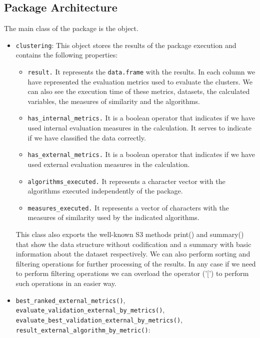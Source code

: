\subsection{Package Architecture}

The main class of the package is the  object.
\begin{itemize}
    \item \texttt{clustering}: This object stores the results of the  package execution and contains the following properties:
    \begin{itemize}
        \item \texttt{result.} It represents the \texttt{data.frame} with the results. In each column we have represented the evaluation metrics used to evaluate the clusters. We can also see the execution time of these metrics, datasets, the calculated variables, the measures of similarity and the algorithms.
        \item \texttt{has\_internal\_metrics.} It is a boolean operator that indicates if we have used internal evaluation measures in the calculation. It serves to indicate if we have classified the data correctly.
        \item \texttt{has\_external\_metrics.} It is a boolean operator that indicates if we have used external evaluation measures in the calculation.
        \item \texttt{algorithms\_executed.} It represents a character vector with the algorithms executed independently of the package.
        \item \texttt{measures\_executed.} It represents a vector of characters with the measures of similarity used by the indicated algorithms.
    \end{itemize}
    This class also exports the well-known S3 methods print() and summary() that show the data
structure without codification and a summary with basic information about the dataset respectively. We can also perform sorting and filtering operations for further processing of the results. In any case if we need to perform filtering operations we can overload the operator ('[') to perform such operations in an easier way.
    \item \texttt{best\_ranked\_external\_metrics()}, \texttt{evaluate\_validation\_external\_by\_metrics()},\\ \texttt{evaluate\_best\_validation\_external\_by\_metrics()},\\ \texttt{result\_external\_algorithm\_by\_metric()}:

\end{itemize}
